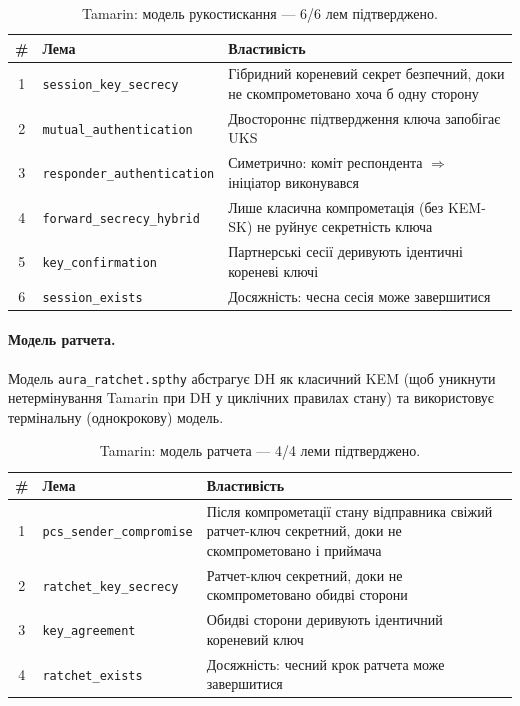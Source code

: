 \documentclass[11pt,a4paper]{article}
\theoremstyle{definition}
\begin{document}
\begin{table}[H]
\centering
\caption{Tamarin: модель рукостискання — 6/6 лем
підтверджено.}\label{tab:tamarin-hs}
\small
\begin{tabularx}{\textwidth}{@{}clX@{}}
\toprule
\# & Лема & Властивість \\
\midrule
1 & \texttt{session\_key\_secrecy} & Гібридний кореневий секрет безпечний, доки не скомпрометовано хоча б одну сторону \\
2 & \texttt{mutual\_authentication} & Двостороннє підтвердження ключа запобігає UKS \\
3 & \texttt{responder\_authentication} & Симетрично: коміт респондента $\Rightarrow$ ініціатор виконувався \\
4 & \texttt{forward\_secrecy\_hybrid} & Лише класична компрометація (без KEM-SK) не руйнує секретність ключа \\
5 & \texttt{key\_confirmation} & Партнерські сесії деривують ідентичні кореневі ключі \\
6 & \texttt{session\_exists} & Досяжність: чесна сесія може завершитися \\
\bottomrule
\end{tabularx}
\end{table}

\paragraph{Модель ратчета.}
Модель \texttt{aura\_ratchet.spthy} абстрагує DH як класичний KEM
(щоб уникнути нетермінування Tamarin при DH у циклічних правилах
стану) та використовує термінальну (однокрокову) модель.

\begin{table}[H]
\centering
\caption{Tamarin: модель ратчета — 4/4 леми
підтверджено.}\label{tab:tamarin-rt}
\small
\begin{tabularx}{\textwidth}{@{}clX@{}}
\toprule
\# & Лема & Властивість \\
\midrule
1 & \texttt{pcs\_sender\_compromise} & Після компрометації стану відправника свіжий ратчет-ключ секретний, доки не скомпрометовано і приймача \\
2 & \texttt{ratchet\_key\_secrecy} & Ратчет-ключ секретний, доки не скомпрометовано обидві сторони \\
3 & \texttt{key\_agreement} & Обидві сторони деривують ідентичний кореневий ключ \\
4 & \texttt{ratchet\_exists} & Досяжність: чесний крок ратчета може завершитися \\
\bottomrule
\end{tabularx}
\end{table}
\end{document}
